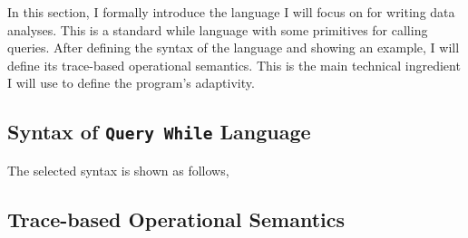 In this section, I formally introduce the language I will focus on for writing data analyses.  
This is a standard while language with some primitives for calling queries. 
After defining the syntax of the language and showing an example, 
I will define its trace-based operational semantics. 
This is the main technical ingredient I will use to define the program's adaptivity.
\subsection{Syntax of {\tt Query While} Language}
\label{sec:language-syntax}
The selected syntax is shown as follows,



\subsection{Trace-based Operational Semantics}
\label{sec:language-os}
